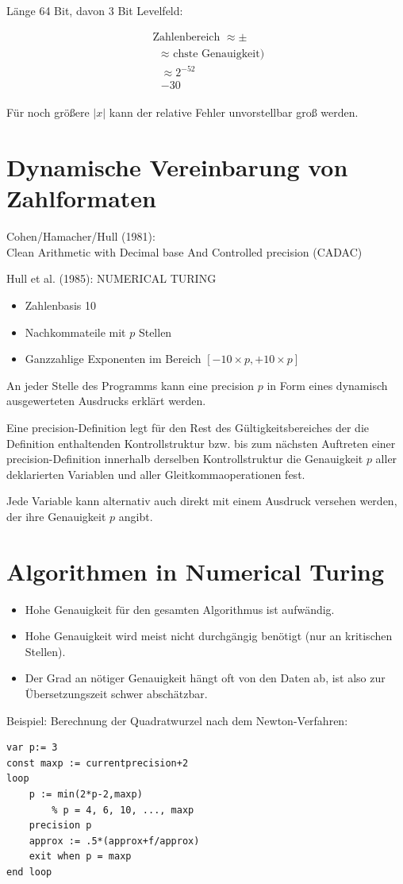 \documentclass[10pt]{article}
\begin{document}
Länge 64 Bit, davon 3 Bit Levelfeld:

$$
\begin{aligned}
& \text { Zahlenbereich } \approx \pm \\
& \text { } \begin{array}{l}
\approx \text { chste Genauigkeit) } \\
\approx 2^{-52} \\
-30
\end{array}
\end{aligned}
$$

Für noch größere $|x|$ kann der relative Fehler unvorstellbar groß werden.

\section*{Dynamische Vereinbarung von Zahlformaten}
Cohen/Hamacher/Hull (1981):\\
Clean Arithmetic with Decimal base And Controlled precision (CADAC)

Hull et al. (1985): NUMERICAL TURING

\begin{itemize}
  \item Zahlenbasis 10
  \item Nachkommateile mit $p$ Stellen
  \item Ganzzahlige Exponenten im Bereich $[-10 \times p,+10 \times p]$
\end{itemize}

An jeder Stelle des Programms kann eine precision $p$ in Form eines dynamisch ausgewerteten Ausdrucks erklärt werden.

Eine precision-Definition legt für den Rest des Gültigkeitsbereiches der die Definition enthaltenden Kontrollstruktur bzw. bis zum nächsten Auftreten einer precision-Definition innerhalb derselben Kontrollstruktur die Genauigkeit $p$ aller deklarierten Variablen und aller Gleitkommaoperationen fest.

Jede Variable kann alternativ auch direkt mit einem Ausdruck versehen werden, der ihre Genauigkeit $p$ angibt.

\section*{Algorithmen in Numerical Turing}
\begin{itemize}
  \item Hohe Genauigkeit für den gesamten Algorithmus ist aufwändig.
  \item Hohe Genauigkeit wird meist nicht durchgängig benötigt (nur an kritischen Stellen).
  \item Der Grad an nötiger Genauigkeit hängt oft von den Daten ab, ist also zur Übersetzungszeit schwer abschätzbar.
\end{itemize}

Beispiel: Berechnung der Quadratwurzel nach dem Newton-Verfahren:

\begin{verbatim}
var p:= 3
const maxp := currentprecision+2
loop
    p := min(2*p-2,maxp)
        % p = 4, 6, 10, ..., maxp
    precision p
    approx := .5*(approx+f/approx)
    exit when p = maxp
end loop
\end{verbatim}
\end{document}
